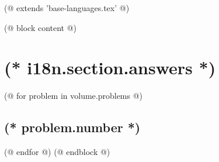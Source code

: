 (@ extends 'base-languages.tex' @)

(@ block content @)
    \pagestyle{main}
    \section{(* i18n.section.answers *)}
    \pagestyle{answers}
    (@ for problem in volume.problems @)%
        \setcounter{volume}{(* volume.number *)}%
        \setcounter{problem}{(* problem.number *)}%
        \subsection{(* problem.number *)}%
    (@ endfor @)
(@ endblock @)

